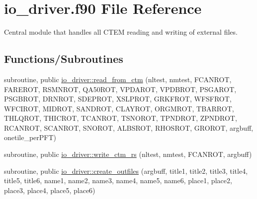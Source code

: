 \hypertarget{io__driver_8f90}{}\section{io\+\_\+driver.\+f90 File Reference}
\label{io__driver_8f90}


Central module that handles all C\+T\+E\+M reading and writing of external files.  


\subsection*{Functions/\+Subroutines}
{\bf }\par
\begin{DoxyCompactItemize}
\item 
subroutine, public \hyperlink{group__io__driver__read__from__ctm_ga754f9c8c8e4e916e436474006963eae9}{io\+\_\+driver\+::read\+\_\+from\+\_\+ctm} (nltest, nmtest, F\+C\+A\+N\+R\+O\+T, F\+A\+R\+E\+R\+O\+T, R\+S\+M\+N\+R\+O\+T, Q\+A50\+R\+O\+T, V\+P\+D\+A\+R\+O\+T, V\+P\+D\+B\+R\+O\+T, P\+S\+G\+A\+R\+O\+T, P\+S\+G\+B\+R\+O\+T, D\+R\+N\+R\+O\+T, S\+D\+E\+P\+R\+O\+T, X\+S\+L\+P\+R\+O\+T, G\+R\+K\+F\+R\+O\+T, W\+F\+S\+F\+R\+O\+T, W\+F\+C\+I\+R\+O\+T, M\+I\+D\+R\+O\+T, S\+A\+N\+D\+R\+O\+T, C\+L\+A\+Y\+R\+O\+T, O\+R\+G\+M\+R\+O\+T, T\+B\+A\+R\+R\+O\+T, T\+H\+L\+Q\+R\+O\+T, T\+H\+I\+C\+R\+O\+T, T\+C\+A\+N\+R\+O\+T, T\+S\+N\+O\+R\+O\+T, T\+P\+N\+D\+R\+O\+T, Z\+P\+N\+D\+R\+O\+T, R\+C\+A\+N\+R\+O\+T, S\+C\+A\+N\+R\+O\+T, S\+N\+O\+R\+O\+T, A\+L\+B\+S\+R\+O\+T, R\+H\+O\+S\+R\+O\+T, G\+R\+O\+R\+O\+T, argbuff, onetile\+\_\+per\+P\+F\+T)
\end{DoxyCompactItemize}

{\bf }\par
\begin{DoxyCompactItemize}
\item 
subroutine, public \hyperlink{group__io__driver__write__ctm__rs_gab85f0131bae0d7249a9c0f0af1713289}{io\+\_\+driver\+::write\+\_\+ctm\+\_\+rs} (nltest, nmtest, F\+C\+A\+N\+R\+O\+T, argbuff)
\end{DoxyCompactItemize}

{\bf }\par
\begin{DoxyCompactItemize}
\item 
subroutine, public \hyperlink{group__io__driver__create__outfiles_ga2eac450ef320091bf7724cf6b178e040}{io\+\_\+driver\+::create\+\_\+outfiles} (argbuff, title1, title2, title3, title4, title5, title6, name1, name2, name3, name4, name5, name6, place1, place2, place3, place4, place5, place6)
\end{DoxyCompactItemize}

